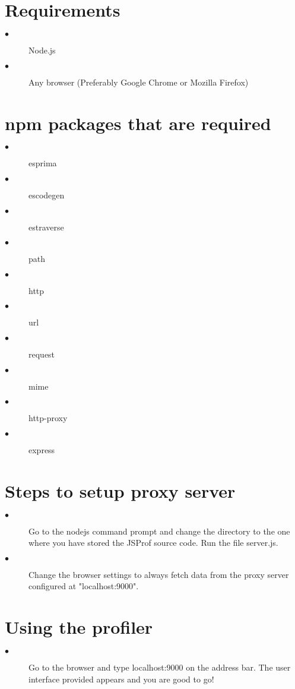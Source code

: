 \documentclass[a4paper, 12pt, notitlepage]{report}
\begin{document}
\section{Requirements}
\begin{description}
\item[$\bullet$] Node.js
\item[$\bullet$] Any browser (Preferably Google Chrome or Mozilla Firefox)
\end{description}

\section{npm packages that are required}
\begin{description}
\item[$\bullet$] esprima
\item[$\bullet$] escodegen
\item[$\bullet$] estraverse
\item[$\bullet$] path
\item[$\bullet$] http
\item[$\bullet$] url
\item[$\bullet$] request
\item[$\bullet$] mime
\item[$\bullet$] http-proxy
\item[$\bullet$] express
\end{description}

\section{Steps to setup proxy server}
\begin{description}
\item[$\bullet$] Go to the nodejs command prompt and change the directory to the one where you have stored the JSProf source code. Run the file server.js.
\item[$\bullet$] Change the browser settings to always fetch data from the proxy server configured at "localhost:9000".
\end{description}

\section{Using the profiler}
\begin{description}
\item[$\bullet$] Go to the browser and type localhost:9000 on the address bar. The user interface provided appears and you are good to go!
\end{description}
\end{document}

